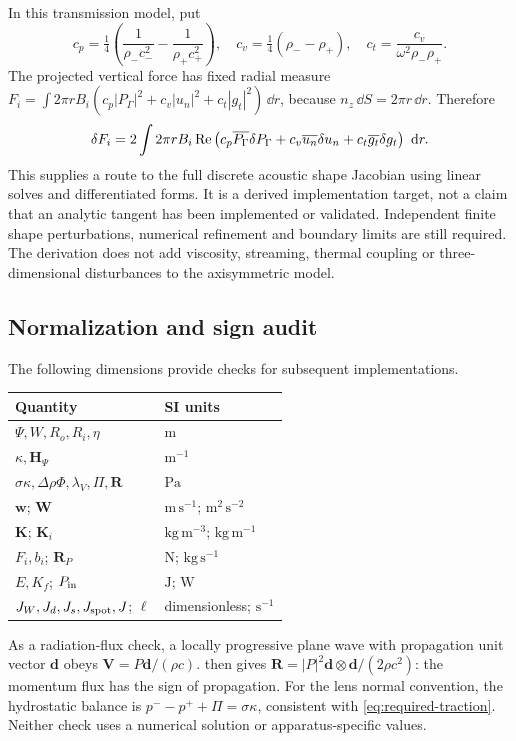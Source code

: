 In this transmission model, put
\[
 c_p=\tfrac14\left(\frac1{\rho_-c_-^2}-\frac1{\rho_+c_+^2}\right),\quad
 c_v=\tfrac14(\rho_--\rho_+),\quad
 c_t=\frac{c_v}{\omega^2\rho_-\rho_+}.
\]
The projected vertical force has fixed radial measure
$F_i=\int2\pi r B_i(c_p|P_\Gamma|^2+c_v|u_n|^2+c_t|g_t|^2)\,\dd r$,
because $n_z\,\dd S=2\pi r\,\dd r$. Therefore
\[
 \delta F_i=2\int2\pi r B_i\operatorname{Re}\left(
 c_p\overline{P_\Gamma}\delta P_\Gamma+
 c_v\overline{u_n}\delta u_n+c_t\overline{g_t}\delta g_t\right)\,\,\mathrm d r.
\]
This supplies a route to the full discrete acoustic shape Jacobian using
linear solves and differentiated forms. It is a derived implementation
target, not a claim that an analytic tangent has been implemented or validated.
Independent finite shape perturbations, numerical refinement and boundary
limits are still required. The derivation does not add viscosity, streaming,
thermal coupling or three-dimensional disturbances to the axisymmetric model.

\subsection{Normalization and sign audit}
The following dimensions provide checks for subsequent implementations.
\begin{center}
\begin{tabular}{@{}ll@{}}
\toprule Quantity & SI units \\\midrule
$\Psi,W,R_o,R_i,\eta$ & $\mathrm m$\\
$\kappa,\bm H_\Psi$ & $\mathrm{m^{-1}}$\\
$\sigma\kappa,\Delta\rho\Phi,\lambda_V,\Pi,\bm R$ & $\mathrm{Pa}$\\
$\bm w$; $\bm W$ & $\mathrm{m\,s^{-1}}$; $\mathrm{m^2\,s^{-2}}$\\
$\bm K$; $\bm K_i$ & $\mathrm{kg\,m^{-3}}$; $\mathrm{kg\,m^{-1}}$\\
$F_i,b_i$; $\bm R_P$ & $\mathrm N$; $\mathrm{kg\,s^{-1}}$\\
$E,K_f$; $P_{\rm in}$ & $\mathrm J$; $\mathrm W$\\
$J_W,J_d,J_s,J_{\rm spot},J$; $\ell$ & dimensionless; $\mathrm{s^{-1}}$\\
\bottomrule
\end{tabular}
\end{center}
As a radiation-flux check, a locally progressive plane wave with propagation
unit vector $\bm d$ obeys $\bm V=P\bm d/(\rho c)$.  then gives
$\bm R=|P|^2\bm d\otimes\bm d/(2\rho c^2)$: the momentum flux has the sign
of propagation. For the lens normal convention, the hydrostatic balance is
$p^- -p^++\Pi=\sigma\kappa$, consistent with
\cref{eq:required-traction}. Neither check uses a numerical solution or
apparatus-specific values.
